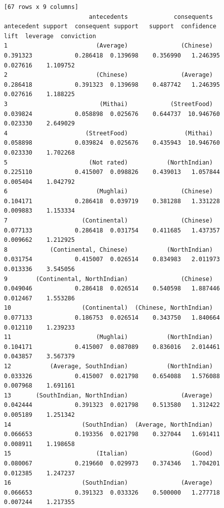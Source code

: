 \documentclass[11pt]{article} %
\begin{document}
\begin{lstlisting}
[67 rows x 9 columns]
                        antecedents             consequents  antecedent support  consequent support   support  confidence       lift  leverage  conviction
1                         (Average)               (Chinese)            0.391323            0.286418  0.139698    0.356990   1.246395  0.027616    1.109752
2                         (Chinese)               (Average)            0.286418            0.391323  0.139698    0.487742   1.246395  0.027616    1.188225
3                          (Mithai)            (StreetFood)            0.039824            0.058898  0.025676    0.644737  10.946760  0.023330    2.649029
4                      (StreetFood)                (Mithai)            0.058898            0.039824  0.025676    0.435943  10.946760  0.023330    1.702268
5                       (Not rated)           (NorthIndian)            0.225110            0.415007  0.098826    0.439013   1.057844  0.005404    1.042792
6                         (Mughlai)               (Chinese)            0.104171            0.286418  0.039719    0.381288   1.331228  0.009883    1.153334
7                     (Continental)               (Chinese)            0.077133            0.286418  0.031754    0.411685   1.437357  0.009662    1.212925
8            (Continental, Chinese)           (NorthIndian)            0.031754            0.415007  0.026514    0.834983   2.011973  0.013336    3.545056
9        (Continental, NorthIndian)               (Chinese)            0.049046            0.286418  0.026514    0.540598   1.887446  0.012467    1.553286
10                    (Continental)  (Chinese, NorthIndian)            0.077133            0.186753  0.026514    0.343750   1.840664  0.012110    1.239233
11                        (Mughlai)           (NorthIndian)            0.104171            0.415007  0.087089    0.836016   2.014461  0.043857    3.567379
12           (Average, SouthIndian)           (NorthIndian)            0.033326            0.415007  0.021798    0.654088   1.576088  0.007968    1.691161
13       (SouthIndian, NorthIndian)               (Average)            0.042444            0.391323  0.021798    0.513580   1.312422  0.005189    1.251342
14                    (SouthIndian)  (Average, NorthIndian)            0.066653            0.193356  0.021798    0.327044   1.691411  0.008911    1.198658
15                        (Italian)                  (Good)            0.080067            0.219660  0.029973    0.374346   1.704201  0.012385    1.247237
16                    (SouthIndian)               (Average)            0.066653            0.391323  0.033326    0.500000   1.277718  0.007244    1.217355

\end{lstlisting}
\end{document}

